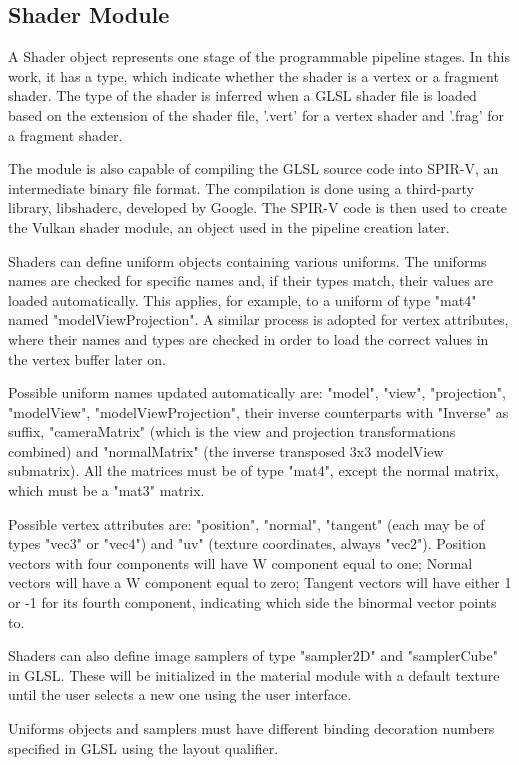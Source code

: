 \subsection{Shader Module}
A Shader object represents one stage of the programmable pipeline stages. In this work, it has a type, which indicate whether the shader is a vertex or a fragment shader. The type of the shader is inferred when a GLSL shader file is loaded based on the extension of the shader file, '.vert' for a vertex shader and '.frag' for a fragment shader.

The module is also capable of compiling the GLSL source code into SPIR-V, an intermediate binary file format. The compilation is done using a third-party library, libshaderc, developed by Google. The SPIR-V code is then used to create the Vulkan shader module, an object used in the pipeline creation later.

Shaders can define uniform objects containing various uniforms. The uniforms names are checked for specific names and, if their types match, their values are loaded automatically. This applies, for example, to a uniform of type "mat4" named "modelViewProjection". A similar process is adopted for vertex attributes, where their names and types are checked in order to load the correct values in the vertex buffer later on.

Possible uniform names updated automatically are: "model", "view", "projection", "modelView", "modelViewProjection", their inverse counterparts with "Inverse" as suffix, "cameraMatrix" (which is the view and projection transformations combined) and "normalMatrix" (the inverse transposed 3x3 modelView submatrix). All the matrices must be of type "mat4", except the normal matrix, which must be a "mat3" matrix.

Possible vertex attributes are: "position", "normal", "tangent" (each may be of types "vec3" or "vec4") and "uv" (texture coordinates, always "vec2"). Position vectors with four components will have W component equal to one; Normal vectors will have a W component equal to zero; Tangent vectors will have either 1 or -1 for its fourth component, indicating which side the binormal vector points to.

Shaders can also define image samplers of type "sampler2D" and "samplerCube" in GLSL. These will be initialized in the material module with a default texture until the user selects a new one using the user interface.

Uniforms objects and samplers must have different binding decoration numbers specified in GLSL using the layout qualifier.
